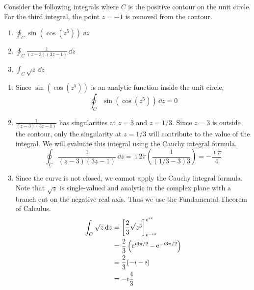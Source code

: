 



\begin{Example}
  Consider the following integrals where $C$ is the positive contour on the
  unit circle.
  For the third integral, the point $z = -1$ is removed from the contour.
  \begin{enumerate}
  \item
    $ \displaystyle \oint_C \sin \left( \cos \left( z^5 \right) \right)\,\dd z$
  \item
    $ \displaystyle \oint_C \frac{1}{(z - 3) (3 z - 1)}\,\dd z$
  \item
    $ \displaystyle \int_C \sqrt{z}\,\dd z$
  \end{enumerate}


  \begin{enumerate}
  \item
    Since $\sin \left( \cos \left( z^5 \right) \right)$ 
    is an analytic function inside the unit circle,
    \[
    \oint_C \sin \left( \cos \left( z^5 \right) \right)\,\dd z = 0
    \]
  \item
    $\frac{1}{(z - 3) (3 z - 1)}$ has singularities at $z = 3$ and $z = 1/3$.
    Since $z = 3$ is outside the contour, only the singularity at $z = 1/3$
    will contribute to the value of the integral.  We will evaluate this
    integral using the Cauchy integral formula.
    \[
    \oint_C \frac{1}{(z - 3) (3 z - 1)}\,\dd z  
    = \imath 2 \pi \left( \frac{1}{(1/3 - 3) 3} \right)
    = - \frac{\imath \pi}{4}
    \]
  \item
    Since the curve is not closed, we cannot apply the Cauchy integral
    formula.  Note that $\sqrt{z}$ is single-valued and analytic in
    the complex plane with a branch cut on the negative real axis.
    Thus we use the Fundamental Theorem of Calculus.
    \begin{align*}
      \int_C \sqrt{z}\,\mathrm{d} z
      &= \left[ \frac{2}{3} \sqrt{z^3} \right]_{\mathop{\mathrm{e}}\nolimits^{-\imath \pi}}^{\mathop{\mathrm{e}}\nolimits^{\imath \pi}} 
      \\
      &= \frac{2}{3} \left( \mathop{\mathrm{e}}\nolimits^{\imath 3 \pi / 2} - \mathop{\mathrm{e}}\nolimits^{-\imath 3 \pi / 2} \right) 
      \\
      &= \frac{2}{3} (-\imath - \imath) 
      \\
      &= - \imath \frac{4}{3}
    \end{align*}
  \end{enumerate}
\end{Example}










